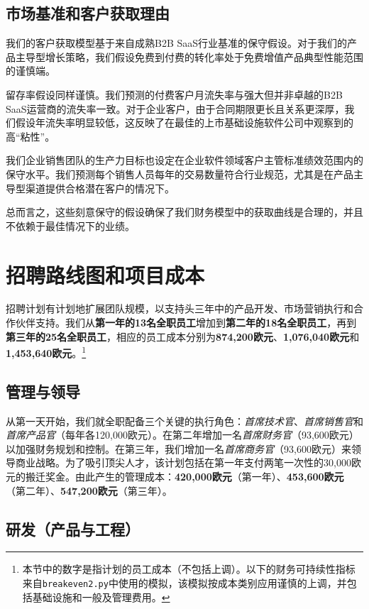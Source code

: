 \documentclass[11pt, a4paper, oneside]{article}
\begin{document}
\subsection{市场基准和客户获取理由}

我们的客户获取模型基于来自成熟B2B SaaS行业基准的保守假设。对于我们的产品主导型增长策略，我们假设免费到付费的转化率处于免费增值产品典型性能范围的谨慎端。

留存率假设同样谨慎。我们预测的付费客户月流失率与强大但并非卓越的B2B SaaS运营商的流失率一致。对于企业客户，由于合同期限更长且关系更深厚，我们假设年流失率明显较低，这反映了在最佳的上市基础设施软件公司中观察到的高“粘性”。

我们企业销售团队的生产力目标也设定在企业软件领域客户主管标准绩效范围内的保守水平。我们预测每个销售人员每年的交易数量符合行业规范，尤其是在产品主导型渠道提供合格潜在客户的情况下。

总而言之，这些刻意保守的假设确保了我们财务模型中的获取曲线是合理的，并且不依赖于最佳情况下的业绩。

\newpage
\section{招聘路线图和项目成本}
\label{sec:hiring-roadmap}

招聘计划有计划地扩展团队规模，以支持头三年中的产品开发、市场营销执行和合作伙伴支持。我们从\textbf{第一年的13名全职员工}增加到\textbf{第二年的18名全职员工}，再到\textbf{第三年的25名全职员工}，相应的员工成本分别为\textbf{874,200欧元}、\textbf{1,076,040欧元}和\textbf{1,453,640欧元}。\footnote{本节中的数字是指计划的员工成本（不包括上调）。以下的财务可持续性指标来自\texttt{breakeven2.py}中使用的模拟，该模拟按成本类别应用谨慎的上调，并包括基础设施和一般及管理费用。}

\subsection{管理与领导}

从第一天开始，我们就全职配备三个关键的执行角色：\textit{首席技术官}、\textit{首席销售官}和\textit{首席产品官}（每年各120,000欧元）。在第二年增加一名\textit{首席财务官}（93,600欧元）以加强财务规划和控制。在第三年，我们增加一名\textit{首席商务官}（93,600欧元）来领导商业战略。为了吸引顶尖人才，该计划包括在第一年支付两笔一次性的30,000欧元的搬迁奖金。由此产生的管理成本：\textbf{420,000欧元}（第一年）、\textbf{453,600欧元}（第二年）、\textbf{547,200欧元}（第三年）。

\subsection{研发（产品与工程）}
\end{document}
